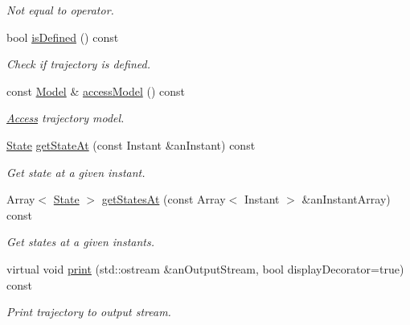 \begin{DoxyCompactItemize}
\begin{DoxyCompactList}\small\item\em Not equal to operator. \end{DoxyCompactList}\item 
bool \hyperlink{classostk_1_1astro_1_1_trajectory_ab0c02a9844e584b50da35df710b71e81}{is\+Defined} () const
\begin{DoxyCompactList}\small\item\em Check if trajectory is defined. \end{DoxyCompactList}\item 
const \hyperlink{classostk_1_1astro_1_1trajectory_1_1_model}{Model} \& \hyperlink{classostk_1_1astro_1_1_trajectory_a7a5e15ddb0b4e1a1546615840610252c}{access\+Model} () const
\begin{DoxyCompactList}\small\item\em \hyperlink{classostk_1_1astro_1_1_access}{Access} trajectory model. \end{DoxyCompactList}\item 
\hyperlink{classostk_1_1astro_1_1trajectory_1_1_state}{State} \hyperlink{classostk_1_1astro_1_1_trajectory_a0814d622d4bfb55cedb3d8eafd39f640}{get\+State\+At} (const Instant \&an\+Instant) const
\begin{DoxyCompactList}\small\item\em Get state at a given instant. \end{DoxyCompactList}\item 
Array$<$ \hyperlink{classostk_1_1astro_1_1trajectory_1_1_state}{State} $>$ \hyperlink{classostk_1_1astro_1_1_trajectory_a31f02515d567ac57c8d5e06d47da08a8}{get\+States\+At} (const Array$<$ Instant $>$ \&an\+Instant\+Array) const
\begin{DoxyCompactList}\small\item\em Get states at a given instants. \end{DoxyCompactList}\item 
virtual void \hyperlink{classostk_1_1astro_1_1_trajectory_aac11fb7c53f4cf970f52f681a75c5261}{print} (std\+::ostream \&an\+Output\+Stream, bool display\+Decorator=true) const
\begin{DoxyCompactList}\small\item\em Print trajectory to output stream. \end{DoxyCompactList}\end{DoxyCompactItemize}
